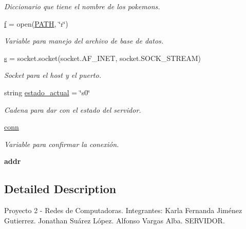 \begin{DoxyCompactItemize}
\begin{DoxyCompactList}\small\item\em Diccionario que tiene el nombre de los pokemons. \end{DoxyCompactList}\item 
\hyperlink{namespaceservidor_a3b9b4590841faa9a4f552f71664e1c90}{f} = open(\hyperlink{namespaceservidor_a841929f3d10a7b72399f0925da460cd9}{P\+A\+TH}, \char`\"{}r\char`\"{})
\begin{DoxyCompactList}\small\item\em Variable para manejo del archivo de base de datos. \end{DoxyCompactList}\item 
\hyperlink{namespaceservidor_ad669abe2ca77beb8398dc4bee9e84daa}{s} = socket.\+socket(socket.\+A\+F\+\_\+\+I\+N\+ET, socket.\+S\+O\+C\+K\+\_\+\+S\+T\+R\+E\+AM)
\begin{DoxyCompactList}\small\item\em Socket para el host y el puerto. \end{DoxyCompactList}\item 
string \hyperlink{namespaceservidor_a08a280b4474bca22179197a9e23f3dde}{estado\+\_\+actual} = \char`\"{}s0\char`\"{}
\begin{DoxyCompactList}\small\item\em Cadena para dar con el estado del servidor. \end{DoxyCompactList}\item 
\hyperlink{namespaceservidor_a6c80b4f26b7083ecd69b24985e6f9d1e}{conn}
\begin{DoxyCompactList}\small\item\em Variable para confirmar la conexión. \end{DoxyCompactList}\item 
\mbox{\label{namespaceservidor_a808a5243ea7d823265019a7f00bd0483}} 
{\bfseries addr}
\end{DoxyCompactItemize}


\subsection{Detailed Description}
\begin{DoxyVerb}Proyecto 2 - Redes de Computadoras.
Integrantes:
    Karla Fernanda Jiménez Gutierrez.
    Jonathan Suárez López.
    Alfonso Vargas Alba.
SERVIDOR.
\end{DoxyVerb}
 

